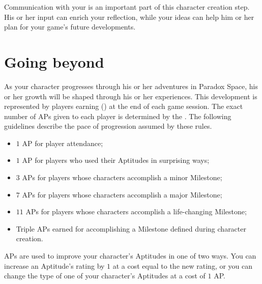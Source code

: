 Communication with your \GM{} is an important part of this character creation step. His or her input can enrich
your reflection, while your ideas can help him or her plan for your game's future developments.

\section{Going beyond}

As your character progresses through his or her adventures in Paradox Space, his or her growth will be shaped
through his or her experiences. This development is represented by players earning 
() at the end of each game session. The exact number of APs given to each player is determined by
the \GM. The following guidelines describe the pace of progression assumed by these rules.
\begin{itemize}
	\item $1$ AP for player attendance;
	\item $1$ AP for players who used their Aptitudes in surprising ways;
	\item $3$ APs for players whose characters accomplish a minor Milestone;
	\item $7$ APs for players whose characters accomplish a major Milestone;
	\item $11$ APs for players whose characters accomplish a life-changing Milestone;
	\item Triple APs earned for accomplishing a Milestone defined during character creation.
\end{itemize}

APs are used to improve your character's Aptitudes in one of two ways.
You can increase an Aptitude's rating by $1$ at a cost equal to the new rating, or you can change the
type of one of your character's Aptitudes at a cost of $1$ AP.
